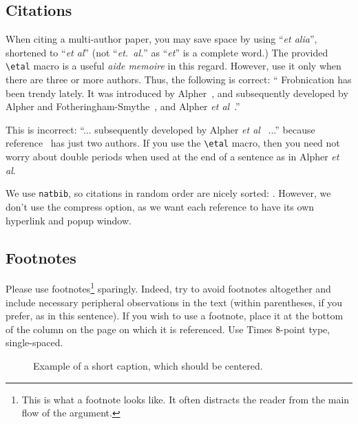 \documentclass{bmvc2k}
\def\etal{\emph{et al}\bmvaOneDot}
\begin{document}
\subsection{Citations}
When citing a multi-author paper, you may save space by using ``{\em et
alia}'', shortened to ``\etal'' (not ``{\em et.\ al.}'' as ``{\em et}'' is
a complete word.)  The provided \verb'\etal' macro is a useful {\em aide
memoire} in this regard.  However, use it only when there are three or more
authors.  Thus, the following is correct: `` Frobnication has been trendy
lately.  It was introduced by Alpher~\cite{Alpher02}, and subsequently
developed by Alpher and Fotheringham-Smythe~\cite{Alpher03}, and Alpher
\etal~\cite{Alpher04}.''

This is incorrect: ``... subsequently developed by Alpher \etal~\cite{Alpher03} ...''
because reference~\cite{Alpher03} has just two authors.  If you use the
\verb'\etal' macro, then you need not worry about double periods
when used at the end of a sentence as in Alpher \etal.

We use {\tt natbib}, so citations in random order are nicely sorted:
 \cite{Alpher03,Alpher02,Authors06b,Authors06}.  However, we don't use the
compress option, as we want each reference to have its own hyperlink and
popup window.

\subsection{Footnotes}

Please use footnotes\footnote {This is what a footnote looks like.  It
often distracts the reader from the main flow of the argument.} sparingly.
Indeed, try to avoid footnotes altogether and include necessary peripheral
observations in
the text (within parentheses, if you prefer, as in this sentence).  If you
wish to use a footnote, place it at the bottom of the column on the page on
which it is referenced. Use Times 8-point type, single-spaced.


\begin{figure}
\begin{center}
\fbox{\rule{0pt}{2in} \rule{.9\linewidth}{0pt}}
\end{center}
   \caption{Example of a short caption, which should be centered.}
\label{fig:short}
\end{figure}
\end{document}
